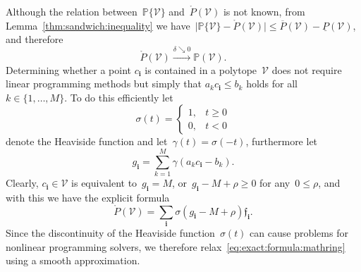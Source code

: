 \documentclass[letterpaper, 10pt, conference]{ieeeconf} %
\providecommand{\bfa}[1]{\mathbf{#1}}
\begin{document}
%
Although the relation between~$\mathbb P\{\mathcal V\}$ and~$\mathring{P}(\mathcal V)$ is not known, from Lemma~\ref{thm:sandwich:inequality} we have~$\lvert\mathbb P\{\mathcal V\}-\mathring{P}(\mathcal V)\rvert \leq \overline{P}(\mathcal V)-\underline{P}(\mathcal V)$, and therefore
\[
\mathring{P}(\mathcal V)\xrightarrow{\delta\searrow0}\mathbb{P}(\mathcal V).
\]
%
Determining whether a point $c_\bfa{i}$ is contained in a polytope~$\mathcal V$ does not require linear programming methods but simply that $a_k c_\bfa{i}\leq b_k$ holds for all~$k\in\{1,\dots,M\}$.
%
To do this efficiently let
\[
\sigma(t)=\begin{cases} 1, & t\geq0 \\
0, & t<0
\end{cases}
\]
denote the Heaviside function and let~$\gamma(t) = \sigma(-t)$, furthermore let
%
\begin{equation}
	g_\bfa{i} = \sum_{k=1}^M\gamma(a_k c_\bfa{i}-b_k).
\end{equation}
%
Clearly, $c_\bfa{i}\in\mathcal V$ is equivalent to~$g_\bfa{i}=M$, or~$g_\bfa{i}-M+\rho\geq0$ for any~$0\leq\rho$, and with this we have the explicit formula
%
\begin{equation}\label{eq:exact:formula:mathring}
	\mathring{P}(\mathcal V) = \sum_{\bfa{i}}\sigma(g_\bfa{i}-M+\rho)\mathfrak f_\bfa{i}.
\end{equation}
%
Since the discontinuity of the Heaviside function~$\sigma(t)$ can cause problems for nonlinear programming solvers, we therefore relax~\eqref{eq:exact:formula:mathring} using a smooth approximation.
%
\end{document}
